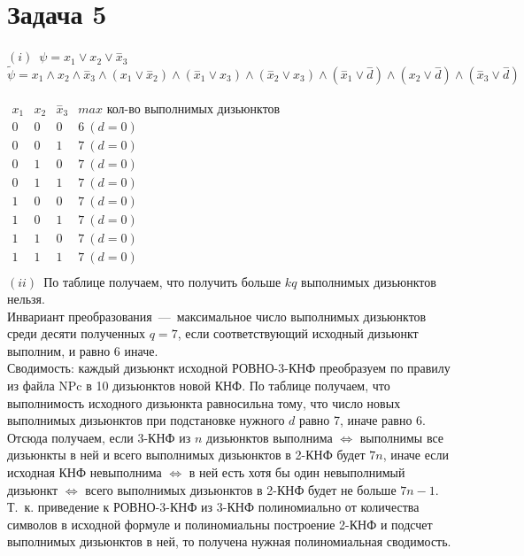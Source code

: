 \documentclass[a4paper,12pt]{article} %
\begin{document}
\section*{Задача 5}

$(i)$~$\psi = x_1 \vee x_2 \vee \overset{-}x_3$\\
$\tilde{\psi} = x_1\wedge x_2\wedge \overset{-}x_3\wedge(x_1\vee\overset{-}x_2)\wedge(\overset{-}x_1\vee x_3)\wedge(\overset{-}x_2\vee x_3)\wedge(\overset{-}x_1\vee\overset{-}d)\wedge(x_2\vee\overset{-}d)\wedge(\overset{-}x_3\vee \overset{-}d)$\\
\\$\begin{matrix}
x_1 & x_2 & \overset{-}x_3 & max \text{~кол-во выполнимых дизьюнктов}\\
0 &0 &0 & 6 ~(d=0)\\ 
0 &0 &1& 7 ~(d=0)\\
0& 1 &0& 7 ~(d=0)\\
0 &1 &1 & 7 ~(d=0)\\
1 &0 &0 & 7 ~(d=0)\\
1 &0 &1& 7~ (d=0)\\
1 &1 &0& 7~ (d=0)\\
1 &1& 1& 7 ~(d=0)\\

\end{matrix}
$\\
$(ii)$~По таблице получаем, что получить больше $kq$ выполнимых дизьюнктов нельзя.\\

 Инвариант преобразования~---~максимальное число выполнимых дизьюнктов среди десяти полученных $q = 7$, если соответствующий исходный дизьюнкт выполним, и равно $6$ иначе.\\
 
Сводимость: каждый дизьюнкт исходной РОВНО-3-КНФ преобразуем по правилу из файла NPc в 10 дизьюнктов новой КНФ. По таблице получаем, что выполнимость исходного дизьюнкта равносильна тому, что число новых выполнимых дизьюнктов при подстановке нужного $d$ равно 7, иначе равно 6. Отсюда получаем, если 3-КНФ из $n$ дизьюнктов выполнима $\Leftrightarrow$ выполнимы все дизьюнкты в ней и всего выполнимых дизьюнктов в 2-КНФ будет $7n$, иначе если 
исходная КНФ невыполнима $\Leftrightarrow$ в ней есть хотя бы один невыполнимый дизьюнкт $\Leftrightarrow$ всего выполнимых дизьюнктов в 2-КНФ будет не больше $7n - 1$. Т.~к. приведение к РОВНО-3-КНФ из 3-КНФ полиномиально от количества символов в исходной формуле и полиномиальны построение 2-КНФ и подсчет выполнимых дизьюнктов в ней, то получена нужная полиномиальная сводимость.\\
\end{document}
